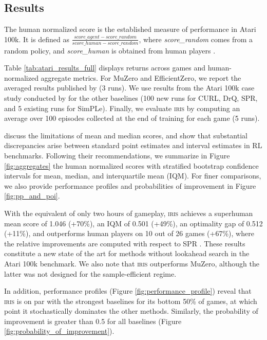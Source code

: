 


\subsection{Results}
\label{section:results}


The human normalized score is the established measure of performance in Atari 100k. It is defined as $\frac{score\_{agent} - score\_{random}}{score\_{human} - score\_{random}}$, where \textit{score\_random} comes from a random policy, and \textit{score\_human} is obtained from human players \citep{dueling_networks}. 

Table \ref{tab:atari_results_full} displays returns across games and human-normalized aggregate metrics. For MuZero and EfficientZero, we report the averaged results published by \citet{efficientzero} (3 runs). We use results from the Atari 100k case study conducted by \citet{agarwal2021deep} for the other baselines (100 new runs for CURL, DrQ, SPR, and 5 existing runs for SimPLe). Finally, we evaluate \textsc{iris} by computing an average over 100 episodes collected at the end of training for each game (5 runs).


\citet{agarwal2021deep} discuss the limitations of mean and median scores, and show that substantial discrepancies arise between standard point estimates and interval estimates in RL benchmarks. Following their recommendations, we summarize in Figure \ref{fig:aggregates} the human normalized scores with stratified bootstrap confidence intervals for mean, median, and interquartile mean (IQM). For finer comparisons, we also provide performance profiles and probabilities of improvement in Figure \ref{fig:pp_and_poi}.

With the equivalent of only two hours of gameplay, \textsc{iris} achieves a superhuman mean score of 1.046 (+70\%), an IQM of 0.501 (+49\%), an optimality gap of 0.512 (+11\%), and outperforms human players on 10 out of 26 games (+67\%), where the relative improvements are computed with respect to SPR \citep{spr}. These results constitute a new state of the art for methods without lookahead search in the Atari 100k benchmark. We also note that \textsc{iris} outperforms MuZero, although the latter was not designed for the sample-efficient regime.   

In addition, performance profiles (Figure \ref{fig:performance_profile}) reveal that \textsc{iris} is on par with the strongest baselines for its bottom 50\% of games, at which point it stochastically dominates \citep{agarwal2021deep, dror2019deep} the other methods. Similarly, the probability of improvement is greater than 0.5 for all baselines (Figure \ref{fig:probability_of_improvement}).   

